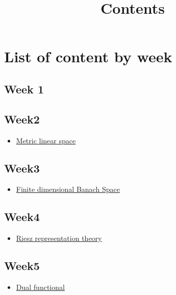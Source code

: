\documentclass{article}
\title{Contents}
\begin{document}
\maketitle
\section{List of content by week}
\subsection{Week 1}
\begin{itemize}
	\item \hyperref[vector space defs]{Linear space, definition 
\end{itemize}

\subsection{Week2}
\begin{itemize}
	\item \hyperref[Metric linear space]{Metric linear space}
	
\end{itemize}

\subsection{Week3}
\begin{itemize}
	\item \hyperref[finite dimensional Banach]{Finite dimensional Banach Space}

	
\end{itemize}

\subsection{Week4}
\begin{itemize}
	\item \hyperref[Riesz representation theory]{Riesz representation theory}
	
\end{itemize}

\subsection{Week5}
\begin{itemize}	
    \item \hyperref[Dual functional]{Dual functional}
\end{itemize}
\end{document}
